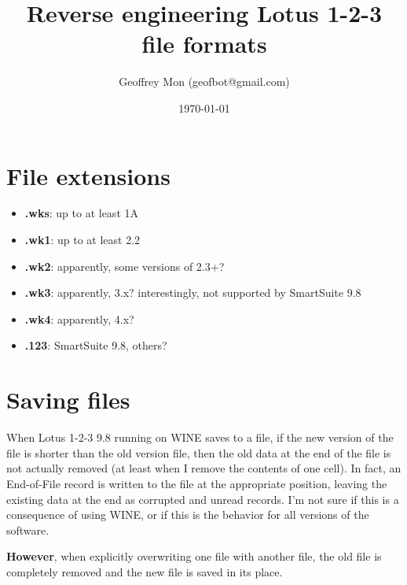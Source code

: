 \documentclass{article}
\title{Reverse engineering Lotus 1-2-3 file formats}
\author{Geoffrey Mon (geofbot@gmail.com)}
\date{\today}
\begin{document}
\maketitle

\section{File extensions}
\begin{itemize}
\item \textbf{.wks}: up to at least 1A
\item \textbf{.wk1}: up to at least 2.2
\item \textbf{.wk2}: apparently, some versions of 2.3+?
\item \textbf{.wk3}: apparently, 3.x?
  interestingly, not supported by SmartSuite 9.8
\item \textbf{.wk4}: apparently, 4.x?
\item \textbf{.123}: SmartSuite 9.8, others?
\end{itemize}

\section{Saving files}
When Lotus 1-2-3 9.8 running on WINE saves to a file, if
the new version of the file is shorter
than the old version file, then the old
data at the end of the file is not actually removed
(at least when I remove the contents of one cell).
In fact, an End-of-File record is written to the file at the
appropriate position, leaving the existing data at the end
as corrupted and unread records.
I'm not sure if this is a consequence of using WINE,
or if this is the behavior for all versions of the software.

\textbf{However}, when explicitly overwriting one file with
another file, the old file is completely removed and
the new file is saved in its place.
\end{document}
